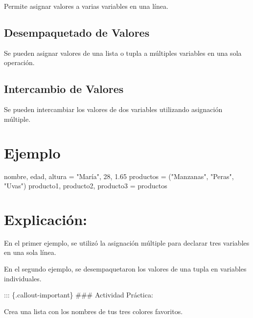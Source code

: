 \documentclass[
  a4paper,
  DIV=11,
  numbers=noendperiod,
  onepage,
  openany]{scrreprt}
\newenvironment{Shaded}{\begin{snugshade}}{\end{snugshade}}
\newcommand{\DecValTok}[1]{\textcolor[rgb]{0.68,0.00,0.00}{#1}}
\newcommand{\FloatTok}[1]{\textcolor[rgb]{0.68,0.00,0.00}{#1}}
\newcommand{\NormalTok}[1]{\textcolor[rgb]{0.00,0.23,0.31}{#1}}
\newcommand{\OperatorTok}[1]{\textcolor[rgb]{0.37,0.37,0.37}{#1}}
\newcommand{\StringTok}[1]{\textcolor[rgb]{0.13,0.47,0.30}{#1}}
\begin{document}
Permite asignar valores a varias variables en una línea.

\hypertarget{desempaquetado-de-valores-1}{%
\subsection{Desempaquetado de
Valores}\label{desempaquetado-de-valores-1}}

Se pueden asignar valores de una lista o tupla a múltiples variables en
una sola operación.

\hypertarget{intercambio-de-valores-1}{%
\subsection{Intercambio de Valores}\label{intercambio-de-valores-1}}

Se pueden intercambiar los valores de dos variables utilizando
asignación múltiple.

\hypertarget{ejemplo-13}{%
\section{Ejemplo}\label{ejemplo-13}}

\begin{Shaded}
\begin{Highlighting}[]
\NormalTok{nombre, edad, altura }\OperatorTok{=} \StringTok{"María"}\NormalTok{, }\DecValTok{28}\NormalTok{, }\FloatTok{1.65}
\NormalTok{productos }\OperatorTok{=}\NormalTok{ (}\StringTok{"Manzanas"}\NormalTok{, }\StringTok{"Peras"}\NormalTok{, }\StringTok{"Uvas"}\NormalTok{)}
\NormalTok{producto1, producto2, producto3 }\OperatorTok{=}\NormalTok{ productos}
\end{Highlighting}
\end{Shaded}

\hypertarget{explicaciuxf3n-13}{%
\section{Explicación:}\label{explicaciuxf3n-13}}

En el primer ejemplo, se utilizó la asignación múltiple para declarar
tres variables en una sola línea.

En el segundo ejemplo, se desempaquetaron los valores de una tupla en
variables individuales.

::: \{.callout-important\} \#\#\# Actividad Práctica:

Crea una lista con los nombres de tus tres colores favoritos.
\end{document}
